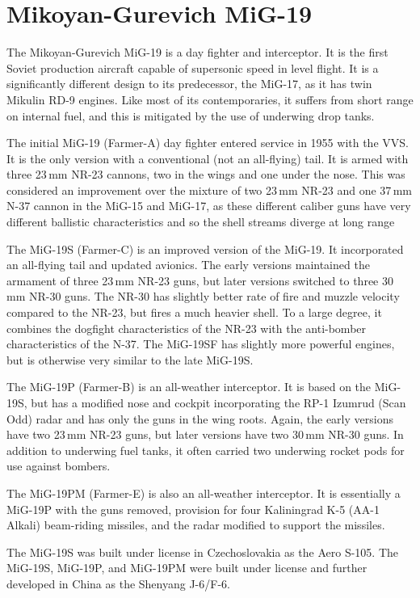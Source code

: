 \section{Mikoyan-Gurevich MiG-19}

The Mikoyan-Gurevich MiG-19 is a day fighter and interceptor. It is the first Soviet production aircraft capable of supersonic speed in level flight. It is a significantly different design to its predecessor, the MiG-17, as it has twin Mikulin RD-9 engines. Like most of its contemporaries, it suffers from short range on internal fuel, and this is mitigated by the use of underwing drop tanks.

The initial MiG-19 (Farmer-A) day fighter entered service in 1955 with the VVS. It is the only version with a conventional (not an all-flying) tail. It is armed with three 23\,mm NR-23 cannons, two in the wings and one under the nose. This was considered an improvement over the mixture of two 23\,mm NR-23 and one 37\,mm N-37 cannon in the MiG-15 and MiG-17, as these different caliber guns have very different ballistic characteristics and so the shell streams diverge at long range

The MiG-19S (Farmer-C) is an improved version of the MiG-19. It incorporated an all-flying tail and updated avionics. The early versions maintained the armament of three 23\,mm NR-23 guns, but later versions switched to three 30\,mm NR-30 guns. The NR-30 has slightly better rate of fire and muzzle velocity compared to the NR-23, but fires a much heavier shell. To a large degree, it combines the dogfight characteristics of the NR-23 with the anti-bomber characteristics of the N-37. The MiG-19SF has slightly more powerful engines, but is otherwise very similar to the late MiG-19S.

The MiG-19P (Farmer-B) is an all-weather interceptor. It is based on the MiG-19S, but has a modified nose and cockpit incorporating the RP-1 Izumrud (Scan Odd) radar and has only the guns in the wing roots. Again, the early versions have two 23\,mm NR-23 guns, but later versions have two 30\,mm NR-30 guns. In addition to underwing fuel tanks, it often carried two underwing rocket pods for use against bombers.

The MiG-19PM (Farmer-E) is also an all-weather interceptor. It is essentially a MiG-19P with the guns removed, provision for four Kaliningrad K-5 (AA-1 Alkali) beam-riding missiles, and the radar modified to support the missiles.

The MiG-19S was built under license in Czechoslovakia as the Aero S-105. The MiG-19S, MiG-19P, and MiG-19PM were built under license and further developed in China as the Shenyang J-6/F-6.

